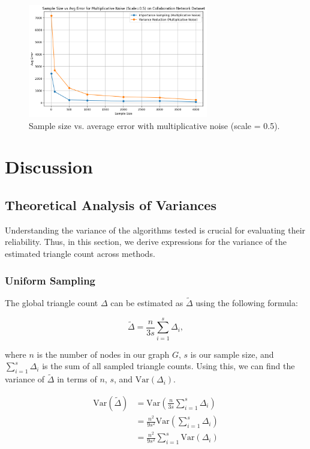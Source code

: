 \documentclass[11pt]{article}
\begin{document}
\begin{figure}[H]
    \centering
    \includegraphics[width=0.7\textwidth]{plots/simulated/percent_error_vs_sample_size_comparison_multiplicative_0.5.png}
    \caption{Sample size vs. average error with multiplicative noise (scale = 0.5).}
    \label{fig:multiplicative_noise_05}
\end{figure}

\newpage

\section{Discussion}

\subsection{Theoretical Analysis of Variances}

Understanding the variance of the algorithms tested is crucial for evaluating their reliability.
Thus, in this section, we derive expressions for the variance of the estimated triangle count across methods.

\subsubsection{Uniform Sampling}

The global triangle count $\Delta$ can be estimated as $\tilde{\Delta}$ using the following formula:

\[
\tilde{\Delta} = \frac{n}{3s} \sum_{i = 1}^{s} \Delta_i,
\]

where $n$ is the number of nodes in our graph $G$, $s$ is our sample size, and $\sum_{i = 1}^{s} \Delta_i$ is the sum of all sampled triangle counts. 
Using this, we can find the variance of $\tilde{\Delta}$ in terms of $n$, $s$, and $\mathrm{Var}(\Delta_i)$.

\[
\begin{aligned}
\mathrm{Var}(\tilde{\Delta}) &= \mathrm{Var} \left( \frac{n}{3s} \sum_{i=1}^{s} \Delta_i \right) \\
&= \frac{n^2}{9s^2} \mathrm{Var} \left( \sum_{i=1}^{s} \Delta_i \right) \\
&= \frac{n^2}{9s^2} \sum_{i=1}^{s} \mathrm{Var}(\Delta_i)
\end{aligned}
\]
\end{document}
